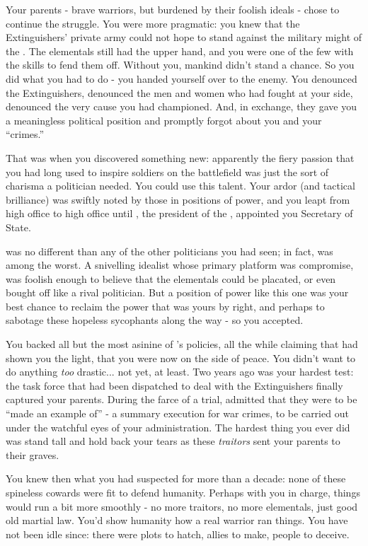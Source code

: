 \documentclass[char]{elementals}
\begin{document}
Your parents - brave warriors, but burdened by their foolish ideals - chose to continue the struggle. You were more pragmatic: you knew that the Extinguishers' private army could not hope to stand against the military might of the \cNewUN{\intro{}}. The elementals still had the upper hand, and you were one of the few with the skills to fend them off. Without you, mankind didn't stand a chance. So you did what you had to do - you handed yourself over to the enemy. You denounced the Extinguishers, denounced the men and women who had fought at your side, denounced the very cause you had championed. And, in exchange, they gave you a meaningless political position and promptly forgot about you and your ``crimes.''

That was when you discovered something new: apparently the fiery passion that you had long used to inspire soldiers on the battlefield was just the sort of charisma a politician needed. You could use this talent. Your ardor (and tactical brilliance) was swiftly noted by those in positions of power, and you leapt from high office to high office until \cLeader{\intro{}} \cLeader{\themself}, the president of the \cNewUN{}, appointed you \cLeader{\their} Secretary of State.

\cLeader{} was no different than any of the other politicians you had seen; in fact, \cLeader{\they} was among the worst. A snivelling idealist whose primary platform was compromise, \cLeader{\they} was foolish enough to believe that the elementals could be placated, or even bought off like a rival politician. But a position of power like this one was your best chance to reclaim the power that was yours by right, and perhaps to sabotage these hopeless sycophants along the way - so you accepted. 

You backed all but the most asinine of \cLeader{}'s policies, all the while claiming that \cLeader{\they} had shown you the light, that you were now on the side of peace. You didn't want to do anything \emph{too} drastic... not yet, at least. Two years ago was your hardest test: the task force that had been dispatched to deal with the Extinguishers finally captured your parents. During the farce of a trial, \cLeader{} admitted that they were to be ``made an example of'' - a summary execution for war crimes, to be carried out under the watchful eyes of your administration. The hardest thing you ever did was stand tall and hold back your tears as these \emph{traitors} sent your parents to their graves.

You knew then what you had suspected for more than a decade: none of these spineless cowards were fit to defend humanity. Perhaps with you in charge, things would run a bit more smoothly - no more traitors, no more elementals, just good old martial law. You'd show humanity how a real warrior ran things. You have not been idle since: there were plots to hatch, allies to make, people to deceive. 
\end{document}
